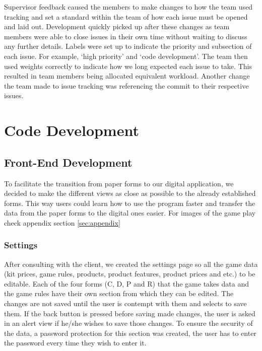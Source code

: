 \documentclass{l3proj}
\begin{document}
Supervisor feedback caused the members to make changes to how the team used tracking and set a standard within the team of how each issue must be opened and laid out. 
Development quickly picked up after these changes as team members were able to close issues in their own time without waiting to discuss any further details. 
Labels were set up to indicate the priority and subsection of each issue. For example, ‘high priority' and ‘code development'. The team then used weights correctly 
to indicate how we long expected each issue to take. This resulted in team members being allocated equivalent workload. Another change the team made to 
issue tracking was referencing the commit to their respective issues.

\section{Code Development}
\label{sec:development}
\subsection{Front-End Development}

To facilitate the transition from paper forms to our digital application, we decided to make the different views as close as possible to the already established forms. This way users could learn how to use the program faster and transfer the data from the paper forms to the digital ones easier. For images of the game play check appendix section \ref{sec:appendix}

\subsubsection{Settings}
After consulting with the client, we created the settings page so all the game data (kit prices, game rules, products, product features, product prices and etc.) to be editable. Each of the four forms (C, D, P and R) that the game takes data and the game rules have their own section from which they can be edited. The changes are not saved until the user is contempt with them and selects to save them. If the back button is pressed before saving made changes, the user is asked in an alert view if he/she wishes to save those changes. To ensure the security of the data, a password protection for this section was created, the user has to enter the password every time they wish to enter it.
\end{document}
